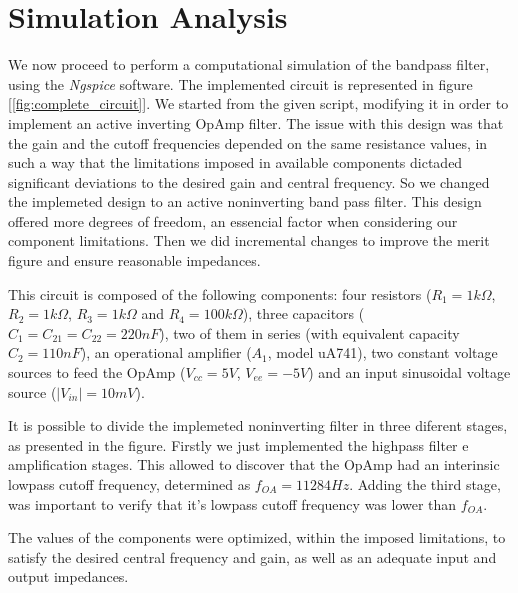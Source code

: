 \section{Simulation Analysis}
\label{sec:simulation}

\par We now proceed to perform a computational simulation of the bandpass filter, using the \textit{Ngspice} software. The implemented circuit is represented in figure [\ref{fig:complete_circuit}]. We started from the given script, modifying it in order to implement an active inverting OpAmp filter. The issue with this design was that the gain and the cutoff frequencies depended on the same resistance values, in such a way that the limitations imposed in available components dictaded significant deviations to the desired gain and central frequency. So we changed the implemeted design to an active noninverting band pass filter. This design offered more degrees of freedom, an essencial factor when considering our component limitations. Then we did incremental changes to improve the merit figure and ensure reasonable impedances.


\par This circuit is composed of the following components: four resistors ($R_{1}=1k\Omega$, $R_{2}=1k\Omega$, $R_{3}=1k\Omega$ and $R_{4}=100k\Omega$), three capacitors ($C_1 = C_{21} = C_{22} = 220 nF$), two of them in series (with equivalent capacity $C_2 = 110nF$), an operational amplifier ($A_1$, model uA741), two constant voltage sources to feed the OpAmp ($V_{cc}=5V$, $V_{ee} = -5V$) and an input sinusoidal voltage source ($|V_{in}| = 10mV$).

\par It is possible to divide the implemeted noninverting filter in three diferent stages, as presented in the figure. Firstly we just implemented the highpass filter e amplification stages. This allowed to discover that the OpAmp had an interinsic lowpass cutoff frequency, determined as $f_{OA} = 11 284 Hz$. Adding the third stage, was important to verify that it's lowpass cutoff frequency was lower than $f_{OA}$.


\par The values of the components were optimized, within the imposed limitations, to satisfy the desired central frequency and gain, as well as an adequate input and output impedances.

